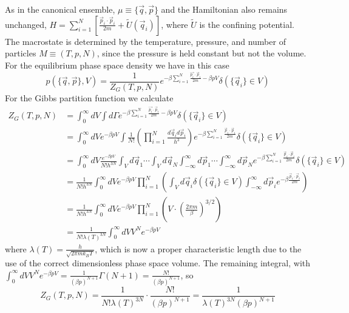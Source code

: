\documentclass[12pt, a4paper, oneside, openright, titlepage]{book}
\begin{document}
As in the canonical ensemble, $\mu \equiv\{\vec{q},\vec{p}\}$ and the Hamiltonian also remains unchanged, $H = \sum_{i=1}^N\left[\frac{\vec{p}_i\cdot\vec{p}_i}{2m} + \tilde{U}(\vec{q}_i)\right]$, where $\tilde{U}$ is the confining potential. The macrostate is determined by the temperature, pressure, and number of particles $M \equiv (T,p,N)$, since the pressure is held constant but not the volume. For the equilibrium phase space density we have in this case \begin{equation*}
    p(\{\vec{q},\vec{p}\},V) = \frac{1}{Z_G(T,p,N)}e^{-\beta\sum_{i=1}^N\frac{\vec{p_i}\cdot\vec{p}_i}{2m} - \beta pV}\delta(\{\vec{q}_i\}\in V)
\end{equation*}
For the Gibbs partition function we calculate \begin{align*}
    Z_G(T,p,N) &= \int_0^{\infty}dV\int d\Gamma e^{-\beta\sum_{i=1}^N\frac{\vec{p_i}\cdot\vec{p}_i}{2m} - \beta pV}\delta(\{\vec{q}_i\}\in V)\\
    &= \int_0^{\infty}dVe^{-\beta p V}\int\frac{1}{N!}\left(\prod_{i=1}^N\frac{d\vec{q}_id\vec{p}_i}{h^3}\right)e^{-\beta\sum_{i=1}^N\frac{\vec{p}_i\cdot\vec{p}_i}{2m}}\delta(\{\vec{q}_i\}\in V) \\
    &= \int_0^{\infty}dV\frac{e^{-\beta pV}}{N!h^{3N}}\int_Vd\vec{q}_1\cdots \int_Vd\vec{q}_N\int_{-\infty}^{\infty}d\vec{p}_1\cdots \int_{-\infty}^{\infty}d\vec{p}_Ne^{-\beta\sum_{i=1}^N\frac{\vec{p}_i\cdot\vec{p}_i}{2m}}\delta(\{\vec{q}_i\}\in V) \\
    &=\frac{1}{N!h^{3N}}\int_0^{\infty}dVe^{-\beta pV}\prod_{i=1}^N\left(\int_Vd\vec{q}_i\delta(\{\vec{q}_i\}\in V)\int_{-\infty}^{\infty}d\vec{p}_ie^{-\beta\frac{\vec{p}_i\cdot\vec{p}_i}{2m}}\right) \\
    &= \frac{1}{N!h^{3N}}\int_0^{\infty}dVe^{-\beta pV}\prod_{i=1}^N\left(V\cdot \left(\frac{2\pi m}{\beta}\right)^{3/2}\right) \\
    &= \frac{1}{N!\lambda(T)^{3N}}\int_0^{\infty}dV V^Ne^{-\beta pV}
\end{align*}
where $\lambda(T) = \frac{h}{\sqrt{2\pi mk_BT}}$, which is now a proper characteristic length due to the use of the correct dimensionless phase space volume. The remaining integral, with $\int_0^{\infty}dV V^Ne^{-\beta pV} = \frac{1}{(\beta p)^{N+1}}\Gamma(N+1) = \frac{N!}{(\beta p)^{N+1}}$, so \begin{equation*}
    Z_G(T,p,N) = \frac{1}{N!\lambda(T)^{3N}}\cdot \frac{N!}{(\beta p)^{N+1}} = \frac{1}{\lambda(T)^{3N}(\beta p)^{N+1}}
\end{equation*}
\end{document}
